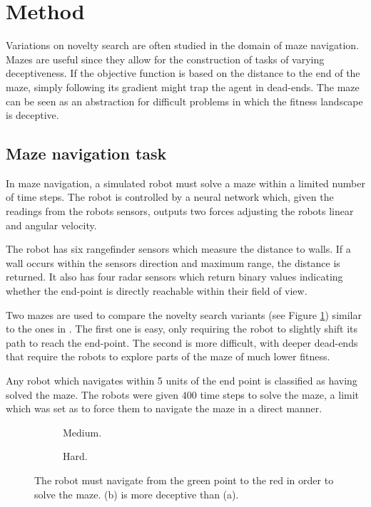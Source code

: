 \section{Method}
Variations on novelty search are often studied in the domain of maze navigation. Mazes are useful
since they allow for the construction of tasks of varying deceptiveness. If the objective function is
based on the distance to the end of the maze, simply following its gradient might trap the agent in
dead-ends. The maze can be seen as an abstraction for difficult problems in which the fitness
landscape is deceptive.

\subsection{Maze navigation task}
In maze navigation, a simulated robot must solve a maze within a limited number of time steps.
The robot is controlled by a neural network which, given the readings from the robots sensors,
outputs two forces adjusting the robots linear and angular velocity.

The robot has six rangefinder sensors which measure the distance to walls. If a wall occurs within the sensors
direction and maximum range, the distance is returned. It also has four radar sensors which return binary
values indicating whether the end-point is directly reachable within their field of view.

Two mazes are used to compare the novelty search variants (see Figure \ref{mazes}) similar to the ones in \cite{novelty_alone}.
The first one is easy, only requiring the robot to slightly shift its path to reach the end-point. The second is more
difficult, with deeper dead-ends that require the robots to explore parts of the maze of much lower fitness.

Any robot which navigates within 5 units of the end point is classified as having solved the maze. The robots
were given $400$ time steps to solve the maze, a limit which was set as to force them to navigate the maze
in a direct manner.


\begin{figure}[H]
    \captionsetup[subfigure]{justification=centering}
    \centering
    \begin{mdframed}
        \begin{subfigure}[b]{0.45\textwidth}
            \centering
            \hspace*{2em}\scalebox{0.3}{}
            \caption{Medium.}
        \end{subfigure}
        \begin{subfigure}[b]{0.5\textwidth}
            \centering
            \hspace*{5em}\scalebox{0.3}{}
            \caption{Hard.}
        \end{subfigure}
    \end{mdframed}
    \caption{The robot must navigate from the green point to the red in order to solve the maze.
             (b) is more deceptive than (a).}
    \label{mazes}
\end{figure}

